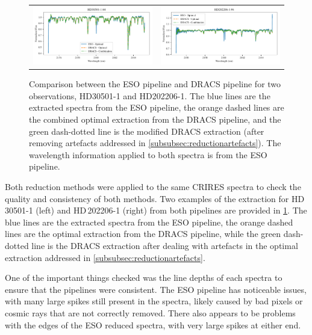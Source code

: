 \begin{figure}
\begin{tabular}{cc}
        \includegraphics[width=0.5\linewidth]{figures/reduction/pipeline_compare/pipeline_compare_HD30501-1_chip_4} & \includegraphics[width=0.5\linewidth]{figures/reduction/pipeline_compare/pipeline_compare_HD202206-1_chip_4}\\
    \end{tabular}
    \caption[Comparision between {DRACS} and {ESOs} reduction pipeline output.]{Comparison between the {ESO} pipeline and {DRACS} pipeline for two observations, {HD30501-1} and {HD202206-1}.
        The blue lines are the extracted spectra from the {ESO} pipeline, the orange dashed lines are the combined optimal extraction from the {DRACS} pipeline, and the green dash-dotted line is the modified {DRACS} extraction (after removing artefacts addressed in \cref{subsubsec:reductionartefacts}).
        The wavelength information applied to both spectra is from the {ESO} pipeline.}
    \label{fig:reduction-comparison}
\end{figure}

Both reduction methods were applied to the same {CRIRES} spectra to check the quality and consistency of both methods.
Two examples of the extraction for HD\,30501-1 (left) and HD\,202206-1 (right) from both pipelines are provided in \cref{fig:reduction-comparison}.
The blue lines are the extracted spectra from the {ESO} pipeline, the orange dashed lines are the optimal extraction from the {DRACS} pipeline, while the green dash-dotted line is the {DRACS} extraction after dealing with artefacts in the optimal extraction addressed in \cref{subsubsec:reductionartefacts}.

One of the important things checked was the line depths of each spectra to ensure that the pipelines were consistent.
The {ESO} pipeline has noticeable issues, with many large spikes still present in the spectra, likely caused by bad pixels or cosmic rays that are not correctly removed.
There also appears to be problems with the edges of the {ESO} reduced spectra, with very large spikes at either end.


